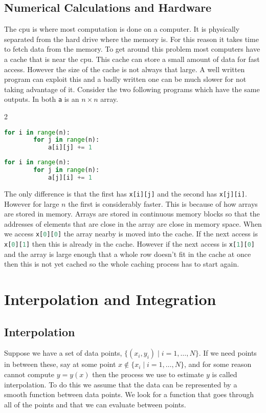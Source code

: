 \documentclass[a4paper]{article}
\newcommand{\st}{\mid}
\begin{document}
    \subsection{Numerical Calculations and Hardware}
    The \gls{cpu} is where most computation is done on a computer.
    It is physically separated from the hard drive where the memory is.
    For this reason it takes time to fetch data from the memory.
    To get around this problem most computers have a cache that is near the \gls{cpu}.
    This cache can store a small amount of data for fast access.
    However the size of the cache is not always that large.
    A well written program can exploit this and a badly written one can be much slower for not taking advantage of it.
    Consider the two following programs which have the same outputs.
    In both \lstinline[language=python]|a| is an \(n\times n\) array.
    \begin{multicols}{2}
    \begin{lstlisting}[language=python]
    for i in range(n):
        for j in range(n):
            a[i][j] += 1
    \end{lstlisting}
    \begin{lstlisting}[language=python]
    for i in range(n):
        for j in range(n):
            a[j][i] += 1
    \end{lstlisting}
    \end{multicols}
    The only difference is that the first has \lstinline[language=python]|x[i][j]| and the second has \lstinline[language=python]|x[j][i]|.
    However for large \(n\) the first is considerably faster.
    This is because of how arrays are stored in memory.
    Arrays are stored in continuous memory blocks so that the addresses of elements that are close in the array are close in memory space.
    When we access \lstinline[language=python]|x[0][0]| the array nearby is moved into the cache.
    If the next access is \lstinline[language=python]|x[0][1]| then this is already in the cache.
    However if the next access is \lstinline[language=python]|x[1][0]| and the array is large enough that a whole row doesn't fit in the cache at once then this is not yet cached so the whole caching process has to start again.
    
    \section{Interpolation and Integration}
    \subsection{Interpolation}
    Suppose we have a set of data points, \(\{(x_i, y_i)\st i = 1, \dotsc, N\}\).
    If we need points in between these, say at some point \(x\notin\{x_i\st i = 1, \dotsc, N\}\), and for some reason cannot compute \(y = y(x)\) then the process we use to estimate \(y\) is called interpolation.
    To do this we assume that the data can be represented by a smooth function between data points.
    We look for a function that goes through all of the points and that we can evaluate between points.
    
\end{document}

